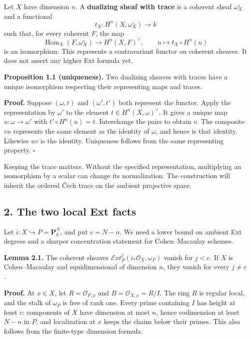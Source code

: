 \documentclass[11pt]{article}
\begin{document}
Let \(X\) have dimension \(n\). A \textbf{dualizing sheaf with trace} is
a coherent sheaf \(\omega_X^\circ\) and a functional \[
t_X:H^n(X,\omega_X^\circ)\longrightarrow k
\] such that, for every coherent \(F\), the map \[
\operatorname{Hom}_X(F,\omega_X^\circ)
 \longrightarrow H^n(X,F)^\vee,
\qquad u\longmapsto t_X\circ H^n(u)
\tag{1}
\] is an isomorphism. This represents a contravariant functor on
coherent sheaves. It does not assert any higher Ext formula yet.

\textbf{Proposition 1.1 (uniqueness).} Two dualizing sheaves with traces
have a unique isomorphism respecting their representing maps and traces.

\textbf{Proof.} Suppose \((\omega,t)\) and \((\omega',t')\) both
represent the functor. Apply the representation by \(\omega'\) to the
element \(t\in H^n(X,\omega)^\vee\). It gives a unique map
\(u:\omega\to\omega'\) with \(t'\circ H^n(u)=t\). Interchange the pairs
to obtain \(v\). The composite \(vu\) represents the same element as the
identity of \(\omega\), and hence is that identity. Likewise \(uv\) is
the identity. Uniqueness follows from the same representing property.
\(\square\)

Keeping the trace matters. Without the specified representation,
multiplying an isomorphism by a scalar can change its normalization. The
construction will inherit the ordered Čech trace on the ambient
projective space.

\subsection{2. The two local Ext facts}\label{the-two-local-ext-facts}

Let \(i:X\hookrightarrow P=\mathbf P^N_k\), and put \(c=N-n\). We need a
lower bound on ambient Ext degrees and a sharper concentration statement
for Cohen--Macaulay schemes.

\textbf{Lemma 2.1.} The coherent sheaves
\(\mathcal E xt_P^j(i_*\mathcal O_X,\omega_P)\) vanish for \(j<c\). If
\(X\) is Cohen--Macaulay and equidimensional of dimension \(n\), they
vanish for every \(j\ne c\).

\textbf{Proof.} At \(x\in X\), let \(R=\mathcal O_{P,x}\) and
\(B=\mathcal O_{X,x}=R/I\). The ring \(R\) is regular local, and the
stalk of \(\omega_P\) is free of rank one. Every prime containing \(I\)
has height at least \(c\): components of \(X\) have dimension at most
\(n\), hence codimension at least \(N-n\) in \(P\), and localization at
\(x\) keeps the chains below their primes. This also follows from the
finite-type dimension formula.
\end{document}
